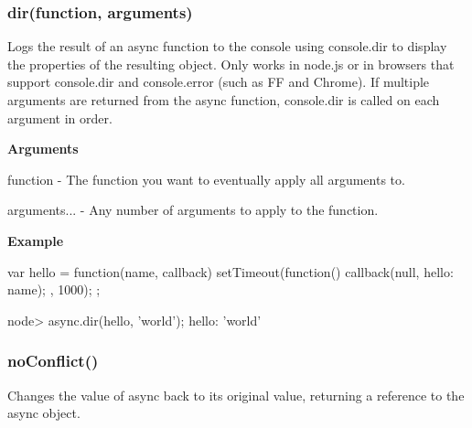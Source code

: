 \label{_dir}%
 \subsubsection*{dir(function, arguments)}

Logs the result of an async function to the console using console.\+dir to display the properties of the resulting object. Only works in node.\+js or in browsers that support console.\+dir and console.\+error (such as F\+F and Chrome). If multiple arguments are returned from the async function, console.\+dir is called on each argument in order.

{\bfseries Arguments}


\begin{DoxyItemize}
\item function -\/ The function you want to eventually apply all arguments to.
\item arguments... -\/ Any number of arguments to apply to the function.
\end{DoxyItemize}

{\bfseries Example} \begin{DoxyVerb}var hello = function(name, callback){
    setTimeout(function(){
        callback(null, {hello: name});
    }, 1000);
};

node> async.dir(hello, 'world');
{hello: 'world'}
\end{DoxyVerb}






\label{_noConflict}%
 \subsubsection*{no\+Conflict()}

Changes the value of async back to its original value, returning a reference to the async object. 